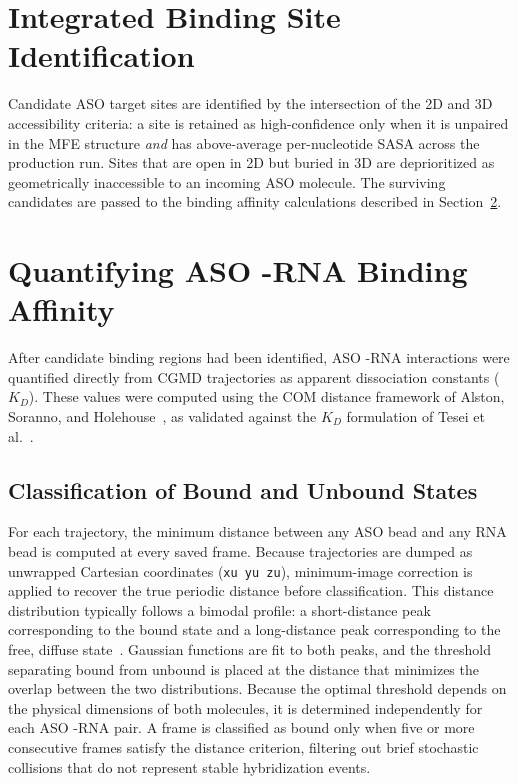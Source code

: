\section{Integrated Binding Site Identification}
\label{sec:site_id}

Candidate ASO target sites are identified by the intersection of the 2D
and 3D accessibility criteria: a site is retained as high-confidence
only when it is unpaired in the MFE structure \emph{and} has
above-average per-nucleotide SASA across the production run.
Sites that are open in 2D but buried in 3D are deprioritized as
geometrically inaccessible to an incoming ASO molecule.
The surviving candidates are passed to the binding affinity calculations
described in Section~\ref{sec:binding_affinity}.

\section{Quantifying ASO -RNA Binding Affinity}
\label{sec:binding_affinity}

After candidate binding regions had been identified, ASO -RNA
interactions were quantified directly from CGMD trajectories as
apparent dissociation constants ($K_D$).
These values were computed using the COM distance framework of Alston,
Soranno, and Holehouse~\cite{Alston2023}, as validated against the
$K_D$ formulation of Tesei et al.~\cite{Tesei2021}.

\subsection{Classification of Bound and Unbound States}
\label{sec:bound_unbound}

For each trajectory, the minimum distance between any ASO bead and any
RNA bead is computed at every saved frame.
Because trajectories are dumped as unwrapped Cartesian coordinates
(\texttt{xu yu zu}), minimum-image correction is applied to recover
the true periodic distance before classification.
This distance distribution typically follows a bimodal profile: a
short-distance peak corresponding to the bound state and a long-distance
peak corresponding to the free, diffuse state~\cite{Alston2023}.
Gaussian functions are fit to both peaks, and the threshold separating
bound from unbound is placed at the distance that minimizes the overlap
between the two distributions.
Because the optimal threshold depends on the physical dimensions of
both molecules, it is determined independently for each ASO -RNA pair.
A frame is classified as bound only when five or more consecutive frames
satisfy the distance criterion, filtering out brief stochastic collisions
that do not represent stable hybridization events.

